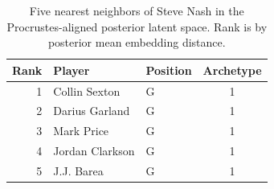 \begin{table}[htbp]
  \centering\small
  \begin{tabular}{rllc}
    \toprule
    Rank & Player & Position & Archetype \\
    \midrule
    1 & Collin Sexton & G & 1 \\
    2 & Darius Garland & G & 1 \\
    3 & Mark Price & G & 1 \\
    4 & Jordan Clarkson & G & 1 \\
    5 & J.J. Barea & G & 1 \\
    \bottomrule
  \end{tabular}
  \caption{Five nearest neighbors of Steve Nash in the Procrustes-aligned posterior latent space. Rank is by posterior mean embedding distance.}
  \label{tab:Steve_Nash_neighbors}
\end{table}

